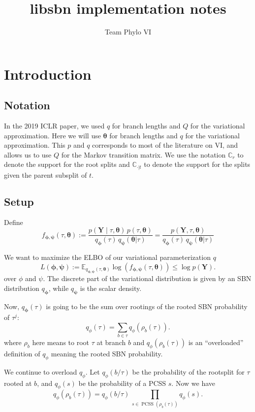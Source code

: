 \documentclass{article}
\title{libsbn implementation notes}
\author{Team Phylo VI}
\newcommand{\PCSS}{\operatorname{PCSS}}
\begin{document}
\maketitle


\section*{Introduction}

\subsection*{Notation}

In the 2019 ICLR paper, we used $q$ for branch lengths and $Q$ for the variational approximation.
Here we will use $\bm \theta$ for branch lengths and $q$ for the variational approximation.
This $p$ and $q$ corresponds to most of the literature on VI, and allows us to use $Q$ for the Markov transition matrix.
We use the notation $\mathbb{C}_r$ to denote the support for the root splits and $\mathbb{C}_{\cdot|t}$ to denote the support for the splits given the parent subsplit of $t$.

\subsection*{Setup}

Define
\[
    f_{\bm{\phi},{\bm{\psi}}}(\tau, \bm \theta) :=
    \frac{p(\bm{Y} \mid \tau, \bm{\theta}) \, p(\tau, \bm{\theta})}
    {q_{\bm{\phi}}(\tau)\, q_{\bm{\psi}}(\bm{\theta}|\tau)}
    = \frac{p(\bm{Y}, \tau, \bm{\theta})}
    {q_{\bm{\phi}}(\tau)\, q_{\bm{\psi}}(\bm{\theta}|\tau)}
\]

We want to maximize the ELBO of our variational parameterization $q$
\[
L(\bm{\phi},{\bm{\psi}}) :=
\mathbb{E}_{q_{\bm{\phi},{\bm{\psi}}}(\tau, \bm{\theta})}
\log\left( f_{\bm{\phi},{\bm{\psi}}}(\tau, \bm \theta) \right) \leq \log p(\bm{Y}).
\]
over $\phi$ and $\psi$.
The discrete part of the variational distribution is given by an SBN distribution $q_{\bm\phi}$, while $q_{\bm\psi}$ is the scalar density.

Now, $q_{\bm{\phi}}(\tau)$ is going to be the sum over rootings of the rooted SBN probability of $\tau^j$:
\[
    q_\phi(\tau) = \sum_{b \in \tau} q_\phi(\rho_b(\tau)).
\]
where $\rho_b$ here means to root $\tau$ at branch $b$ and $q_\phi(\rho_b(\tau))$ is an ``overloaded'' definition of $q_\phi$ meaning the rooted SBN probability.

We continue to overload $q_\phi$.
Let $q_\phi(b \slash \tau)$ be the probability of the rootsplit for $\tau$ rooted at $b$, and
$q_\phi(s)$ be the probability of a PCSS $s$.
Now we have
\begin{equation}
    q_\phi(\rho_b(\tau)) = q_\phi(b \slash \tau) \, \prod_{s \in \PCSS(\rho_b(\tau))} q_\phi(s).
    \label{eq:qRooted}
\end{equation}
\end{document}
